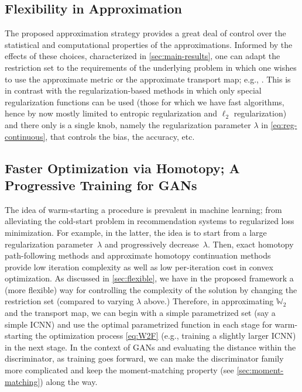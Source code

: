 \documentclass[10pt]{article}
\newcommand{\W}{\mathds{W}}
\numberwithin{equation}{section}
\begin{document}
\subsection{Flexibility in Approximation}\label{sec:flexible}
The proposed approximation strategy provides a great deal of control over the statistical and computational properties of the approximations. Informed by the effects of these choices, characterized in \autoref{sec:main-results}, one can adapt the restriction set to the requirements of the underlying problem in which one wishes to use the approximate metric or the approximate transport map; e.g., \citep{rabin2011removing,rabin2011wasserstein}. This is in contrast with the regularization-based methods in which only special regularization functions can be used (those for which we have fast algorithms, hence by now mostly limited to entropic regularization and $\ell_2$ regularization) and there only is a single knob, namely the regularization parameter $\lambda$ in \eqref{eq:reg-continuous}, that controls the bias, the accuracy, etc. 

\subsection{Faster Optimization via Homotopy; A Progressive Training for GANs}\label{sec:homotopy}
The idea of warm-starting a procedure is prevalent in machine learning; from alleviating the cold-start problem in recommendation systems to regularized loss minimization. For example, in the latter, the idea is to start from a large regularization parameter~$\lambda$ and progressively decrease~$\lambda$. Then, exact homotopy path-following methods \citep{osborne2000lasso,osborne2000new,efron2004least} and approximate homotopy continuation methods \citep{hale2008fixed,xiao2013proximal} provide low iteration complexity as well as low per-iteration cost in convex optimization. As discussed in \autoref{sec:flexible}, we have in the proposed framework a (more flexible) way for controlling the complexity of the solution by changing the restriction set (compared to varying $\lambda$ above.) Therefore, in approximating $\W_2$ and the transport map, we can begin with a simple parametrized set (say a simple ICNN) and use the optimal parametrized function in each stage for warm-starting the optimization process \eqref{eq:W2F} (e.g., training a slightly larger ICNN) in the next stage. In the context of GANs and evaluating the distance within the discriminator, as training goes forward, we can make the discriminator family more complicated and keep the moment-matching property (see \autoref{sec:moment-matching}) along the way. 
\end{document}
